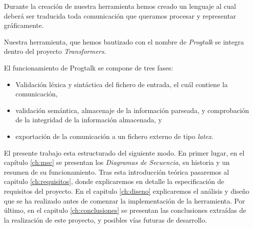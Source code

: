 Durante la creación de nuestra herramienta hemos creado un lenguaje 
al cual deberá ser traducida toda comunicación que queramos procesar y
representar gráficamente.

Nuestra herramienta, que hemos bautizado con el nombre de
\textit{Progtalk} se integra dentro del proyecto \textit{Transformers}. 

El funcionamiento de Progtalk se compone de tres fases:

\begin{itemize}
\item Validación léxica y sintáctica del fichero de entrada, el cuál
  contiene la comunicación,
\item validación semántica, almacenaje de la información parseada, y
  comprobación de la integridad de la información almacenada, y
\item exportación de la comunicación a un fichero externo de tipo
  \textit{latex}.
\end{itemize}

El presente trabajo esta estructurado del siguiente modo. En primer
lugar, en el capítulo \ref{ch:msc} se presentan los \textit{Diagramas
  de Secuencia}, su historia y un resumen de su funcionamiento. Tras
esta introducción teórica pasaremos al capitulo \ref{ch:requisitos},
donde explicaremos en detalle la especificación de requisitos del
proyecto. En el capitulo \ref{ch:diseno} explicaremos el
análisis y diseño que se ha realizado antes de comenzar la
implementación de la herramienta. Por último, en el capitulo
\ref{ch:conclusiones} se presentan las conclusiones extraídas de la
realización de este proyecto, y posibles vías futuras de desarrollo.

